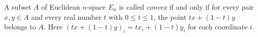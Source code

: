 A subset $A$ of Euclidean $n$-space $E_n$ is called \emph{convex} if and only if for every pair $x, y \in A$ and every real number $t$ with $0 \leq t \leq 1$, the point $t x + (1 - t) y$ belongs to $A$. Here $(t x + (1 - t) y)_i = t x_i + (1 - t) y_i$ for each coordinate $i$.
